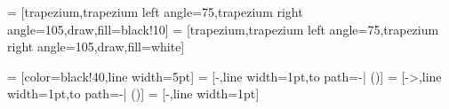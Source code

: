 %

 = [trapezium,trapezium left angle=75,trapezium right angle=105,draw,fill=black!10]
 = [trapezium,trapezium left angle=75,trapezium right angle=105,draw,fill=white]


%

 = [color=black!40,line width=5pt]
 = [-,line width=1pt,to path={-| (\tikztotarget)}]
 = [->,line width=1pt,to path={-| (\tikztotarget)}]
 = [-,line width=1pt]


